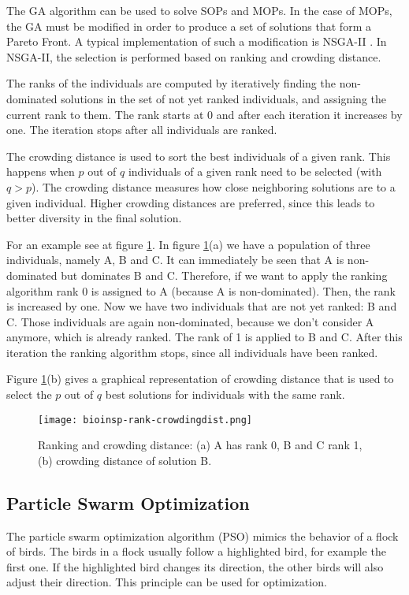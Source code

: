 The GA algorithm can be used to solve SOPs and MOPs. In the case of MOPs, the GA must be modified in order to produce a set of solutions that form a Pareto Front. A typical implementation of such a modification is NSGA-II \cite{deb2002fast}. In NSGA-II, the selection is performed based on ranking and crowding distance.

The ranks of the individuals are computed by iteratively finding the non-dominated solutions in the set of not yet ranked individuals, and assigning the current rank to them. The rank starts at 0 and after each iteration it increases by one. The iteration stops after all individuals are ranked.

The crowding distance is used to sort the best individuals of a given rank. This happens when $p$ out of $q$ individuals of a given rank need to be selected (with $q > p$). The crowding distance measures how close neighboring solutions are to a given individual. Higher crowding distances are preferred, since this leads to better diversity in the final solution.

For an example see at figure \ref{fig:rank-crowdingdist}. In figure \ref{fig:rank-crowdingdist}(a) we have a population of three individuals, namely A, B and C. It can immediately be seen that A is non-dominated but dominates B and C. Therefore, if we want to apply the ranking algorithm rank 0 is assigned to A (because A is non-dominated). Then, the rank is increased by one. Now we have two individuals that are not yet ranked: B and C. Those individuals are again non-dominated, because we don't consider A anymore, which is already ranked. The rank of 1 is applied to B and C. After this iteration the ranking algorithm stops, since all individuals have been ranked.

Figure \ref{fig:rank-crowdingdist}(b) gives a graphical representation of crowding distance that is used to select the $p$ out of $q$ best solutions for individuals with the same rank.

\begin{figure}
  \centering
  \texttt{[image: bioinsp-rank-crowdingdist.png]}
  \caption[Ranking and crowding distance]{Ranking and crowding distance: (a) A has rank 0, B and C rank 1, (b) crowding distance of solution B.}
  \label{fig:rank-crowdingdist}
\end{figure}

\subsection{Particle Swarm Optimization}
The particle swarm optimization algorithm (PSO) mimics the behavior of a flock of birds. The birds in a flock usually follow a highlighted bird, for example the first one. If the highlighted bird changes its direction, the other birds will also adjust their direction. This principle can be used for optimization.

